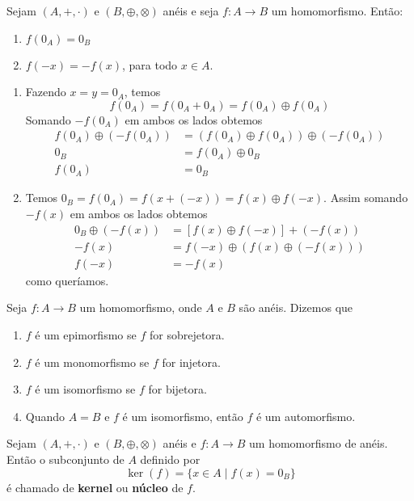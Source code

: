 \begin{proposicao}
	Sejam $(A, +, \cdot)$ e $(B, \oplus, \otimes)$ an\'eis e seja $f : A \to B$ um homomorfismo. Ent{\~a}o:
	\begin{enumerate}[label={\roman*})]
		\item $f(0_{A}) = 0_{B}$
		\item $f(-x) = -f(x)$, para todo $x \in A$.
	\end{enumerate}
\end{proposicao}
\begin{prova}
	\begin{enumerate}[label={\roman*})]
		\item Fazendo $x = y = 0_{A}$, temos
		\[
			f(0_A) = f(0_A + 0_A) = f(0_A) \oplus f(0_A)
		\]
		Somando $-f(0_A)$ em ambos os lados obtemos
		\begin{align*}
			f(0_A) \oplus (-f(0_A)) &= (f(0_A)\oplus f(0_A)) \oplus (-f(0_A))\\
			0_B &= f(0_A) \oplus 0_B\\
			f(0_A) &= 0_B
		\end{align*}

		\item Temos $0_B = f(0_A) = f(x + (-x)) = f(x)\oplus f(-x)$. Assim somando $-f(x)$ em ambos os lados obtemos
		\begin{align*}
			0_B\oplus(-f(x)) &= [f(x)\oplus f(-x)] + (-f(x))\\
			-f(x) &= f(-x) \oplus (f(x) \oplus (-f(x)))\\
			f(-x) &= -f(x)
		\end{align*}
		como queríamos.
	\end{enumerate}
\end{prova}

\begin{definicao}Seja $f:A\rightarrow B$ um homomorfismo, onde $A$ e $B$ s{\~a}o an{\'e}is. Dizemos que
	\begin{enumerate}[label={\roman*})]
		\item $f$ {\'e} um epimorfismo se $f$ for sobrejetora.
		\item $f$ {\'e} um monomorfismo se $f$ for injetora.
		\item $f$ {\'e} um isomorfismo se $f$ for bijetora.
		\item Quando $A=B$ e $f$ {\'e} um isomorfismo, ent{\~a}o $f$ {\'e} um automorfismo.
	\end{enumerate}
\end{definicao}

\begin{definicao}
	Sejam $(A, +, \cdot)$ e $(B, \oplus, \otimes)$ an\'eis e $f : A \to B$ um homomorfismo de an\'eis. Ent\~ao o subconjunto de $A$ definido por
	\[
		\ker(f) = \{ x \in A \mid f(x) = 0_B\}
	\]
	\'e chamado de \textbf{kernel} ou \textbf{n\'ucleo} de $f$.
\end{definicao}


